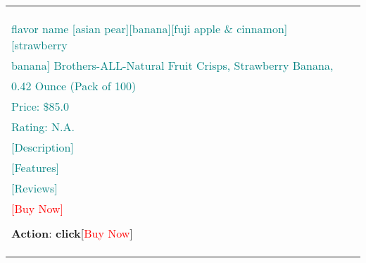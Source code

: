 \begin{table}[H]
\begin{tabular}{l|l}
{\textbf{Observation}:\\
\textcolor{red}{} \\
\textcolor{red}{} \\
\textcolor{teal}{
flavor name [asian pear][banana][fuji apple \& cinnamon][strawberry}\\ \textcolor{teal}{banana]
Brothers-ALL-Natural Fruit Crisps, Strawberry Banana,}\\ \textcolor{teal}{0.42 Ounce (Pack of 100)}\\ 
\textcolor{teal}{Price: \$85.0}\\
\textcolor{teal}{Rating: N.A.}\\
\textcolor{teal}{[Description]}\\
\textcolor{teal}{[Features]}\\
\textcolor{teal}{[Reviews]}\\
\textcolor{red}{[Buy Now]}\\
\\
\textbf{Action}: \textbf{click}[\textcolor{red}{Buy Now}]\\
\\
\\
}

&


\end{tabular}
\end{table}
